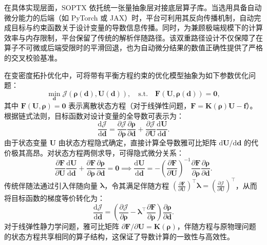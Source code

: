 在具体实现层面，SOPTX 依托统一张量抽象层对接底层算子库。当选用具备自动微分能力的后端（如 PyTorch 或 JAX）时，平台可利用其反向传播机制，自动完成目标与约束函数关于设计变量的导数信息传播。同时，为兼顾极端规模下的计算效率与内存限制，平台保留了传统的解析伴随路径。该双重路径设计不仅保障了在算子不可微或后端受限时的平滑回退，也为自动微分结果的数值正确性提供了严格的交叉校验基准。

在变密度拓扑优化中，可将带有平衡方程约束的优化模型抽象为如下参数优化问题：
\[
\min_{\boldsymbol{d}} \mathcal{J}(\boldsymbol{\rho}(\boldsymbol{d}), \boldsymbol{U}(\boldsymbol{d})), \quad \text{s.t.} \quad \boldsymbol{F}(\boldsymbol{U}, \boldsymbol{\rho}(\boldsymbol{d})) = \mathbf{0},
\]
其中 $\boldsymbol{F}(\boldsymbol{U}, \boldsymbol{\rho}) = \mathbf{0}$ 表示离散状态方程（对于线弹性问题，$\boldsymbol{F} = \boldsymbol{K}(\boldsymbol{\rho})\boldsymbol{U} - \boldsymbol{f}$）。根据链式法则，目标函数对设计变量的全导数可表示为：
\[
\frac{\mathrm{d}\mathcal{J}}{\mathrm{d}\boldsymbol{d}} = \frac{\partial \mathcal{J}}{\partial \boldsymbol{\rho}} \frac{\partial \boldsymbol{\rho}}{\partial \boldsymbol{d}} + \frac{\partial \mathcal{J}}{\partial \boldsymbol{U}} \frac{\mathrm{d}\boldsymbol{U}}{\mathrm{d}\boldsymbol{d}}.
\]
由于状态变量 $\boldsymbol{U}$ 由状态方程隐式确定，直接计算全导数雅可比矩阵 $\mathrm{d}\boldsymbol{U}/\mathrm{d}\boldsymbol{d}$ 的代价极其高昂。对状态方程两侧求导，可得隐式微分关系：
\[
\frac{\partial \boldsymbol{F}}{\partial \boldsymbol{U}} \frac{\mathrm{d}\boldsymbol{U}}{\mathrm{d}\boldsymbol{d}} + \frac{\partial \boldsymbol{F}}{\partial \boldsymbol{\rho}} \frac{\partial \boldsymbol{\rho}}{\partial \boldsymbol{d}} = \mathbf{0} \implies \frac{\mathrm{d}\boldsymbol{U}}{\mathrm{d}\boldsymbol{d}} = - \left( \frac{\partial \boldsymbol{F}}{\partial \boldsymbol{U}} \right)^{-1} \frac{\partial \boldsymbol{F}}{\partial \boldsymbol{\rho}} \frac{\partial \boldsymbol{\rho}}{\partial \boldsymbol{d}}.
\]
传统伴随法通过引入伴随向量 $\boldsymbol{\lambda}$，令其满足伴随方程 $\left( \frac{\partial \boldsymbol{F}}{\partial \boldsymbol{U}} \right)^{\top} \boldsymbol{\lambda} = \left( \frac{\partial \mathcal{J}}{\partial \boldsymbol{U}} \right)^{\top}$，从而将目标函数的梯度等价转化为：
\[
\frac{\mathrm{d}\mathcal{J}}{\mathrm{d}\boldsymbol{d}} = \left( \frac{\partial \mathcal{J}}{\partial \boldsymbol{\rho}} - \boldsymbol{\lambda}^{\top} \frac{\partial \boldsymbol{F}}{\partial \boldsymbol{\rho}} \right) \frac{\partial \boldsymbol{\rho}}{\partial \boldsymbol{d}}.
\]
对于线弹性静力学问题，雅可比矩阵 $\partial \boldsymbol{F}/\partial \boldsymbol{U} = \boldsymbol{K}(\boldsymbol{\rho})$，伴随方程与原物理问题的状态方程共享相同的算子结构，这保证了导数计算的一致性与高效性。

